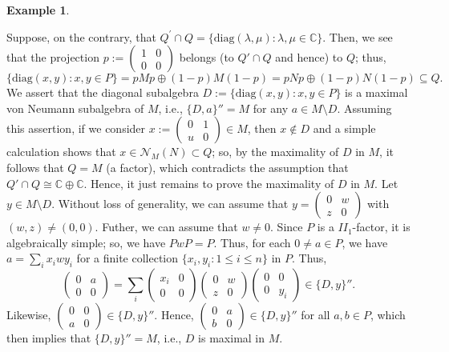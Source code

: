 \documentclass{amsart}
\theoremstyle{definition}
\newtheorem{example}[theorem]{Example}
\theoremstyle{theorem}
\newcommand{\C}{\mathbb{C}}
\begin{document}
\begin{example}
\begin{enumerate}
  Suppose, on the contrary, that $Q^{\prime}\cap Q =
  \{\mathrm{diag}(\lambda , \mu) : \lambda, \mu \in \C\}$. Then, we
  see that the projection $p:= \begin{pmatrix} 1& 0 \\ 0 & 0
  \end{pmatrix}$
  belongs (to $Q'\cap Q$ and hence) to $Q$; thus,
  \[
  \{\mathrm{diag}(x,y) : x,y \in P\}= pMp\oplus
  (1-p)M(1-p)=pNp\oplus (1-p)N(1-p)\subseteq Q.
  \]
We assert that the diagonal subalgebra $  D := \{\mathrm{diag}(x,y) : x,y \in P\}$ is a maximal von Neumann
subalgebra of $M$, i.e., $\{ D, a\}''=M$ for any $a \in M \setminus
D$. Assuming this assertion, if we consider $x:= \begin{pmatrix} 0 & 1 \\ u & 0
  \end{pmatrix}\in M$, then  $x\notin D$ and  a simple calculation
shows that $x \in \mathcal{N}_M(N)\subset Q$; so, by the maximality of
$D$ in $M$, it follows that $Q = M$ (a factor), which contradicts the
assumption that $Q'\cap Q \cong \C \oplus \C$. Hence, it just remains
to prove the maximality of $D$ in $M$. Let $y \in M\setminus
D$. Without loss of generality, we can assume that $y=\begin{pmatrix}
0 & w \\ z & 0 \end{pmatrix} $ with $(w,z) \neq (0,0)$. Futher, we can
assume that $w \neq 0$. Since $P$ is a $II_1$-factor, it is
algebraically simple; so, we have $PwP =P$. Thus, for each $0 \neq a
\in P$, we have $a= \sum_{i} x_i w y_i$ for a finite collection
$\{x_i, y_i: 1 \leq i \leq n\}$ in $P$. Thus,
\[
\begin{pmatrix} 0 & a \\ 0 & 0 \end{pmatrix} = \sum_i \begin{pmatrix} x_i & 0 \\ 0 & 0 \end{pmatrix}
\begin{pmatrix} 0 & w \\ z & 0 \end{pmatrix} \begin{pmatrix} 0 & 0 \\ 0 & y_i \end{pmatrix}\in \{D, y\}''.
\]
Likewise, $\begin{pmatrix} 0 & 0 \\ a & 0 \end{pmatrix} \in \{D,
y\}''$. Hence, $\begin{pmatrix} 0 & a \\ b & 0 \end{pmatrix} \in \{D,
y\}''$ for all $a, b \in P$, which then implies that $\{D, y\}''= M$,
i.e., $D$ is maximal in $M$.  \color{black}
  \end{enumerate}

 \end{example}
 
\end{document}
